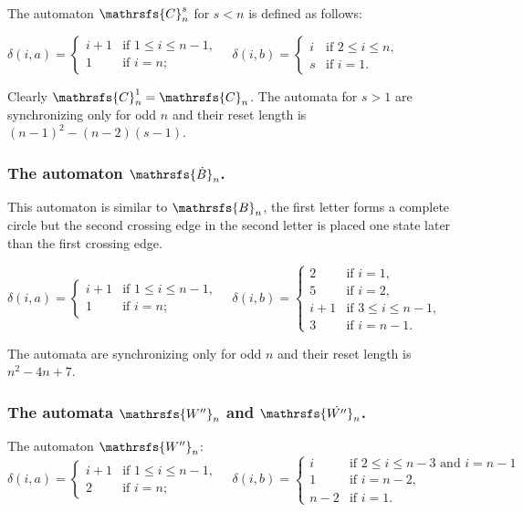 \documentclass[runningheads,a4paper]{llncs}
\newcommand{\<}{\langle}
\renewcommand{\>}{\rangle}
\begin{document}
\begin{definition}The automaton $\mathrsfs{C}^s_n$ for $s < n$ is defined as follows:

$\delta(i,a)=\begin{cases}
i+1 &\text{if } 1 \le i \le n-1,\\
1 &\text{if } i=n;
\end{cases}\quad
\delta(i,b)=\begin{cases}
i &\text{if } 2 \le i \le n,\\
s &\text{if } i=1.
\end{cases}$
\end{definition}

Clearly $\mathrsfs{C}^1_n = \mathrsfs{C}_n$. The automata for $s > 1$ are synchronizing only for odd $n$ and their reset length is $(n-1)^2-(n-2)(s-1)$.

\subsubsection{The automaton $\mathrsfs{\dot{B}}_n$.}
This automaton is similar to $\mathrsfs{B}_n$, the first letter forms a complete circle but the second crossing edge in the second letter is placed one state later than the first crossing edge.

$\delta(i,a)=\begin{cases}
i+1 &\text{if } 1 \le i \le n-1,\\
1 &\text{if } i=n;
\end{cases}\quad
\delta(i,b)=\begin{cases}
2 &\text{if } i=1,\\
5 &\text{if } i=2,\\
i+1 &\text{if } 3 \le i \le n-1,\\
3 &\text{if } i=n-1.
\end{cases}$

The automata are synchronizing only for odd $n$ and their reset length is $n^2-4n+7$.

\subsubsection{The automata $\mathrsfs{W''}_n$ and $\mathrsfs{\dot{W''}}_n$.}
The automaton $\mathrsfs{W''}_n$:\\
$\delta(i,a)=\begin{cases}
i+1 &\text{if } 1 \le i \le n-1,\\
2 &\text{if } i=n;
\end{cases}\quad
\delta(i,b)=\begin{cases}
i &\text{if } 2 \le i \le n-3 \text{ and } i=n-1\\
1 &\text{if } i=n-2,\\
n-2 &\text{if } i=1.
\end{cases}$
\end{document}
